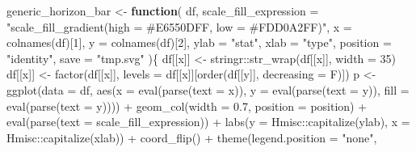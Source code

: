\documentclass[
]{article}
\newenvironment{Shaded}{\begin{snugshade}}{\end{snugshade}}
\newcommand{\AttributeTok}[1]{\textcolor[rgb]{0.77,0.63,0.00}{#1}}
\newcommand{\ControlFlowTok}[1]{\textcolor[rgb]{0.13,0.29,0.53}{\textbf{#1}}}
\newcommand{\DecValTok}[1]{\textcolor[rgb]{0.00,0.00,0.81}{#1}}
\newcommand{\FloatTok}[1]{\textcolor[rgb]{0.00,0.00,0.81}{#1}}
\newcommand{\FunctionTok}[1]{\textcolor[rgb]{0.00,0.00,0.00}{#1}}
\newcommand{\NormalTok}[1]{#1}
\newcommand{\OtherTok}[1]{\textcolor[rgb]{0.56,0.35,0.01}{#1}}
\newcommand{\SpecialCharTok}[1]{\textcolor[rgb]{0.00,0.00,0.00}{#1}}
\newcommand{\StringTok}[1]{\textcolor[rgb]{0.31,0.60,0.02}{#1}}
\begin{document}
\begin{Shaded}
\begin{Highlighting}[]
\NormalTok{generic\_horizon\_bar }\OtherTok{\textless{}{-}} 
  \ControlFlowTok{function}\NormalTok{(}
\NormalTok{           df,}
           \AttributeTok{scale\_fill\_expression =} \StringTok{"scale\_fill\_gradient(high = \textquotesingle{}\#E6550DFF\textquotesingle{}, low = \textquotesingle{}\#FDD0A2FF\textquotesingle{})"}\NormalTok{,}
           \AttributeTok{x =} \FunctionTok{colnames}\NormalTok{(df)[}\DecValTok{1}\NormalTok{],}
           \AttributeTok{y =} \FunctionTok{colnames}\NormalTok{(df)[}\DecValTok{2}\NormalTok{],}
           \AttributeTok{ylab =} \StringTok{"stat"}\NormalTok{,}
           \AttributeTok{xlab =} \StringTok{"type"}\NormalTok{,}
           \AttributeTok{position =} \StringTok{"identity"}\NormalTok{,}
           \AttributeTok{save =} \StringTok{"tmp.svg"}
\NormalTok{           )\{}
\NormalTok{    df[[x]] }\OtherTok{\textless{}{-}}\NormalTok{ stringr}\SpecialCharTok{::}\FunctionTok{str\_wrap}\NormalTok{(df[[x]], }\AttributeTok{width =} \DecValTok{35}\NormalTok{)}
\NormalTok{    df[[x]] }\OtherTok{\textless{}{-}} \FunctionTok{factor}\NormalTok{(df[[x]], }\AttributeTok{levels =}\NormalTok{ df[[x]][}\FunctionTok{order}\NormalTok{(df[[y]], }\AttributeTok{decreasing =}\NormalTok{ F)])}
\NormalTok{    p }\OtherTok{\textless{}{-}} \FunctionTok{ggplot}\NormalTok{(}\AttributeTok{data =}\NormalTok{ df,}
                \FunctionTok{aes}\NormalTok{(}\AttributeTok{x =} \FunctionTok{eval}\NormalTok{(}\FunctionTok{parse}\NormalTok{(}\AttributeTok{text =}\NormalTok{ x)),}
                    \AttributeTok{y =} \FunctionTok{eval}\NormalTok{(}\FunctionTok{parse}\NormalTok{(}\AttributeTok{text =}\NormalTok{ y)),}
                    \AttributeTok{fill =} \FunctionTok{eval}\NormalTok{(}\FunctionTok{parse}\NormalTok{(}\AttributeTok{text =}\NormalTok{ y)))) }\SpecialCharTok{+}
      \FunctionTok{geom\_col}\NormalTok{(}\AttributeTok{width =} \FloatTok{0.7}\NormalTok{, }\AttributeTok{position =}\NormalTok{ position) }\SpecialCharTok{+}
      \FunctionTok{eval}\NormalTok{(}\FunctionTok{parse}\NormalTok{(}\AttributeTok{text =}\NormalTok{ scale\_fill\_expression)) }\SpecialCharTok{+}
      \FunctionTok{labs}\NormalTok{(}\AttributeTok{y =}\NormalTok{ Hmisc}\SpecialCharTok{::}\FunctionTok{capitalize}\NormalTok{(ylab),}
           \AttributeTok{x =}\NormalTok{ Hmisc}\SpecialCharTok{::}\FunctionTok{capitalize}\NormalTok{(xlab)) }\SpecialCharTok{+}
      \FunctionTok{coord\_flip}\NormalTok{() }\SpecialCharTok{+}
      \FunctionTok{theme}\NormalTok{(}\AttributeTok{legend.position =} \StringTok{"none"}\NormalTok{,}

\end{Highlighting}
\end{Shaded}
\end{document}
